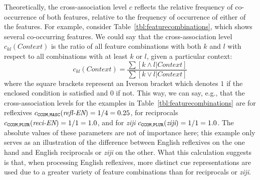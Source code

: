 \documentclass{cambridge7A}\usepackage[]{graphicx}\usepackage[]{color}
\newcommand{\actrcue}[1]{\texttt{\uppercase{#1}}}
\begin{document}
Theoretically, the cross-association level $c$ reflects the
relative frequency of co-occurrence of both features, relative to the frequency of occurrence of either of the features.
For example, consider 
Table~\ref{tbl:featurecombinations}, which shows several co-occurring features. 
We could say that the cross-association level $c_{kl}(Context)$ is the ratio of all feature combinations with both $k$ and $l$ with respect to all combinations with at least $k$ or $l$, given a particular context:
\begin{equation}
	\label{eq:cmetric}
	c_{kl}(Context) = \frac{\sum{[k \land l | Context]}}{\sum{[k \lor l | Context]}} 
\end{equation}
% 
where 
the square brackets represent an Iverson bracket which denotes $1$ if the enclosed condition is satisfied and $0$ if not.
% 
This way, we can say, e.g., that the cross-association levels for the examples in Table~\ref{tbl:featurecombinations} are for reflexives $c_{\actrcue{ccom},\actrcue{masc}}(\textit{refl-EN}) = 1/4 = 0.25$, for reciprocals $c_{\actrcue{ccom},\actrcue{plur}}(\textit{reci-EN}) = 1/1 = 1.0$, and for \textit{ziji} $c_{\actrcue{ccom},\actrcue{plur}}(\textit{ziji}) = 1/1 = 1.0$.
The absolute values of these parameters are not of importance here; this example only serves as an illustration of the difference between English reflexives on the one hand and English reciprocals or \textit{ziji} on the other.
What this calculation suggests is that, when processing English reflexives, more distinct cue representations are used due to a greater variety of feature combinations than for reciprocals or \textit{ziji}.
\end{document}
